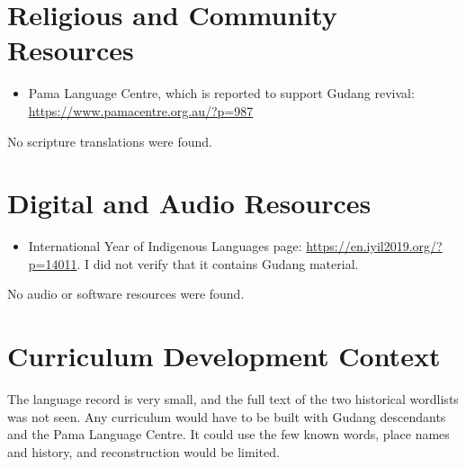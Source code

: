 \documentclass[12pt]{article}
\begin{document}
\section{Religious and Community Resources}
\begin{itemize}
\item Pama Language Centre, which is reported to support Gudang revival: \url{https://www.pamacentre.org.au/?p=987}
\end{itemize}
No scripture translations were found.

\section{Digital and Audio Resources}
\begin{itemize}
\item International Year of Indigenous Languages page: \url{https://en.iyil2019.org/?p=14011}. I did not verify that it contains Gudang material.
\end{itemize}
No audio or software resources were found.

\section{Curriculum Development Context}
The language record is very small, and the full text of the two historical wordlists was not seen. Any curriculum would have to be built with Gudang descendants and the Pama Language Centre. It could use the few known words, place names and history, and reconstruction would be limited.
\end{document}
